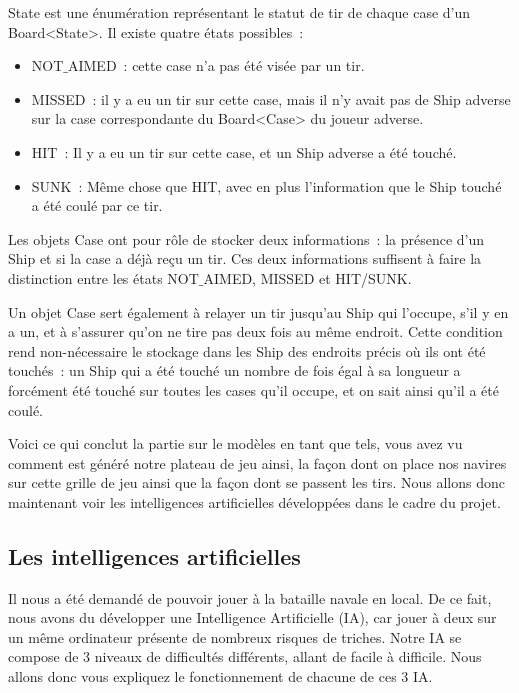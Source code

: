 	State est une énumération représentant le statut de tir de chaque case d'un Board<State>. Il existe quatre états possibles~:
	\begin{itemize}
		\item NOT$\_$AIMED~: cette case n'a pas été visée par un tir.
		\item MISSED~: il y a eu un tir sur cette case, mais il n'y avait pas de Ship adverse sur la case correspondante du Board<Case> du joueur adverse.
		\item HIT~: Il y a eu un tir sur cette case, et un Ship adverse a été touché.
		\item SUNK~: Même chose que HIT, avec en plus l'information que le Ship touché a été coulé par ce tir.
	\end{itemize}

	Les objets Case ont pour rôle de stocker deux informations~: la présence d'un Ship et si la case a déjà reçu un tir. Ces deux informations suffisent à faire la distinction entre les états NOT$\_$AIMED, MISSED et HIT/SUNK. \newline
	
	Un objet Case sert également à relayer un tir jusqu'au Ship qui l'occupe, s'il y en a un, et à s'assurer qu'on ne tire pas deux fois au même endroit. Cette condition rend non-nécessaire le stockage dans les Ship des endroits précis où ils ont été touchés~: un Ship qui a été touché un nombre de fois égal à sa longueur a forcément été touché sur toutes les cases qu'il occupe, et on sait ainsi qu'il a été coulé.\newline	
	
	Voici ce qui conclut la partie sur le modèles en tant que tels, vous avez vu comment est généré notre plateau de jeu ainsi, la façon dont on place nos navires sur cette grille de jeu ainsi que la façon dont se passent les tirs. Nous allons donc maintenant voir les intelligences artificielles développées dans le cadre du projet.
	
	\newpage

\subsection{Les intelligences artificielles}
	Il nous a été demandé de pouvoir jouer à la bataille navale en local. 
De ce fait, nous avons du développer une Intelligence Artificielle (IA), car jouer à deux sur un même ordinateur présente de nombreux risques de triches.\newline
	Notre IA se compose de 3 niveaux de difficultés différents, allant de facile à difficile. Nous allons donc vous expliquez le fonctionnement de chacune de ces 3 IA.\newline

